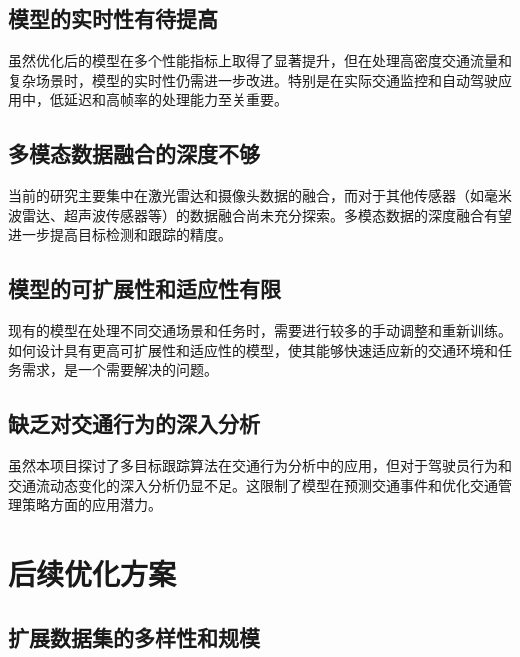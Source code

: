 \subsection{模型的实时性有待提高}


虽然优化后的模型在多个性能指标上取得了显著提升，但在处理高密度交通流量和复杂场景时，模型的实时性仍需进一步改进。特别是在实际交通监控和自动驾驶应用中，低延迟和高帧率的处理能力至关重要\cite{罗玉涛 2024 面向自动驾驶的多任务辅助驾驶策略学习方法}。





\subsection{多模态数据融合的深度不够}



当前的研究主要集中在激光雷达和摄像头数据的融合，而对于其他传感器（如毫米波雷达、超声波传感器等）的数据融合尚未充分探索。多模态数据的深度融合有望进一步提高目标检测和跟踪的精度\cite{一种基于Carla模拟器实现智能驾驶的方法}。






\subsection{模型的可扩展性和适应性有限}


现有的模型在处理不同交通场景和任务时，需要进行较多的手动调整和重新训练。如何设计具有更高可扩展性和适应性的模型，使其能够快速适应新的交通环境和任务需求，是一个需要解决的问题\cite{胡学敏 2024 仿真到现实环境的自动驾驶决策技术综述}。



\subsection{缺乏对交通行为的深入分析}


虽然本项目探讨了多目标跟踪算法在交通行为分析中的应用，但对于驾驶员行为和交通流动态变化的深入分析仍显不足。这限制了模型在预测交通事件和优化交通管理策略方面的应用潜力\cite{zhang2019deep}。




\section{后续优化方案}



\subsection{扩展数据集的多样性和规模}

